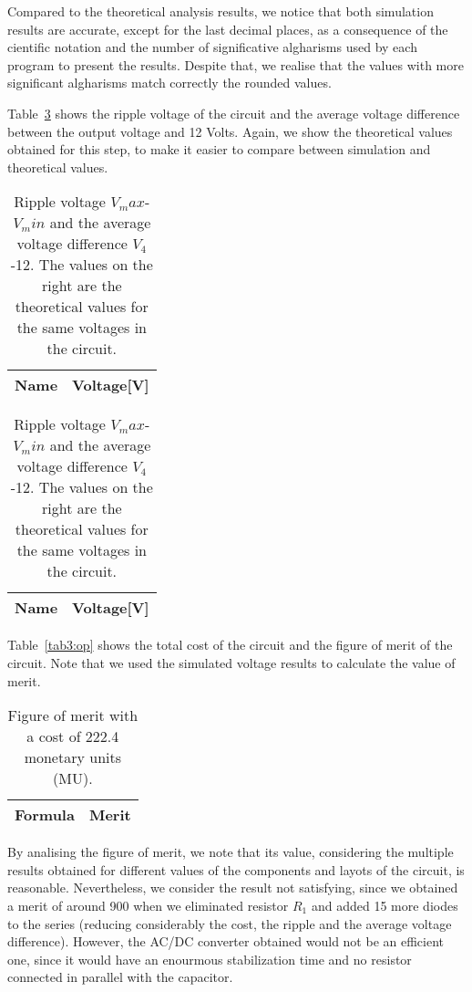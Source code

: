 	Compared to the theoretical analysis results, we notice that both simulation results are accurate, except for the last 
decimal places, as a consequence of the cientific notation and the number of significative algharisms used by each program to 
present the results. Despite that, we realise that the values with more significant algharisms match correctly the rounded values.


	Table~\ref{tab2:op} shows the ripple voltage of the circuit and the average voltage difference
	between the output voltage and 12 Volts. Again, we show the theoretical values obtained for this step, 
	to make it easier to compare between simulation and theoretical values.


\begin{table}[H]
  \centering
  \begin{tabular}{|l|r|}
    \hline    
    {\bf Name} & {\bf Voltage[V]} \\ \hline
    
  \end{tabular}
  \begin{tabular}{|l|r|}
    \hline    
    {\bf Name} & {\bf Voltage[V]} \\ \hline
    
  \end{tabular}
  \caption{Ripple voltage $V_max$-$V_min$ and the average voltage difference $V_4$-12. The values on the right are the theoretical 
  values for the same voltages in the circuit.}
  \label{tab2:op}
\end{table}


Table~\ref{tab3:op} shows the total cost of the circuit and the figure of merit of the circuit. 
Note that we used the simulated voltage results to calculate the value of merit.


\begin{table}[H]
  \centering
  \begin{tabular}{|l|r|}
    \hline    
    {\bf Formula} & {\bf Merit} \\ \hline
    
  \end{tabular}
  \caption{Figure of merit with a cost of 222.4 monetary units (MU).}
  \label{tab2:op}
\end{table}

By analising the figure of merit, we note that its value, considering the multiple results obtained for different values of the components and layots of the circuit, is
reasonable. Nevertheless, we consider the result not satisfying, since we obtained a merit of around 900 when we eliminated resistor $R_1$ and added 15 more diodes to the series
(reducing considerably the cost, the ripple and the average voltage difference). However, the AC/DC converter obtained would not be an efficient one, since it would have an enourmous
stabilization time and no resistor connected in parallel with the capacitor.

